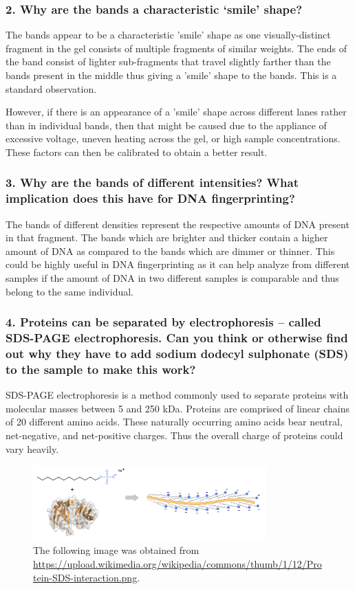 \documentclass[pdflatex,sn-mathphys]{sn-jnl}%
\theoremstyle{thmstyleone}%
\theoremstyle{thmstyletwo}%
\theoremstyle{thmstylethree}%
\begin{document}
\subsubsection*{2. Why are the bands a characteristic ‘smile’ shape?}
The bands appear to be a characteristic 'smile' shape as one visually-distinct fragment in the gel consists of multiple fragments of similar weights. The ends of the band consist of lighter sub-fragments that travel slightly farther than the bands present in the middle thus giving a 'smile' shape to the bands. This is a standard observation. 

However, if there is an appearance of a 'smile' shape across different lanes rather than in individual bands, then that might be caused due to the appliance of excessive voltage, uneven heating across the gel, or high sample concentrations. These factors can then be calibrated to obtain a better result. 

\subsubsection*{3. Why are the bands of different intensities? What implication does this have for DNA fingerprinting?}
The bands of different densities represent the respective amounts of DNA present in that fragment. The bands which are brighter and thicker contain a higher amount of DNA as compared to the bands which are dimmer or thinner. This could be highly useful in DNA fingerprinting as it can help analyze from different samples if the amount of DNA in two different samples is comparable and thus belong to the same individual.

\subsubsection*{4. Proteins can be separated by electrophoresis – called SDS-PAGE electrophoresis. Can you think or otherwise find out why they have to add sodium dodecyl sulphonate (SDS) to the sample to make this work?}
SDS-PAGE electrophoresis is a method commonly used to separate proteins with molecular masses between 5 and 250 kDa. Proteins are comprised of linear chains of 20 different amino acids. These naturally occurring amino acids bear neutral, net-negative, and net-positive charges. Thus the overall charge of proteins could vary heavily.

\begin{figure}[hp]
\centering
\includegraphics[width=0.8\textwidth]{photos/Protein-SDS_interaction.png}
\caption{The following image was obtained from \href{https://upload.wikimedia.org/wikipedia/commons/thumb/1/12/Protein-SDS_interaction.png/800px-Protein-SDS_interaction.png}{https://upload.wikimedia.org/wikipedia/commons/thumb/1/12/Protein-SDS-interaction.png}.}\label{fig1}
\end{figure}
\end{document}
